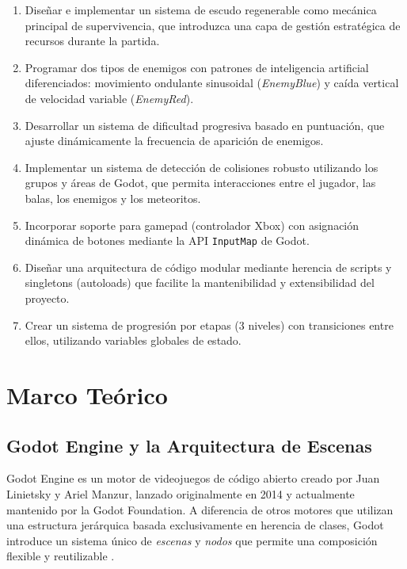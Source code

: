 \documentclass[12pt, a4paper, oneside]{report}
\begin{document}
\begin{enumerate}[label=\textbf{OE\arabic*:}, leftmargin=*]
    \item Diseñar e implementar un sistema de escudo regenerable como mecánica principal de supervivencia, que introduzca una capa de gestión estratégica de recursos durante la partida.
    \item Programar dos tipos de enemigos con patrones de inteligencia artificial diferenciados: movimiento ondulante sinusoidal (\textit{EnemyBlue}) y caída vertical de velocidad variable (\textit{EnemyRed}).
    \item Desarrollar un sistema de dificultad progresiva basado en puntuación, que ajuste dinámicamente la frecuencia de aparición de enemigos.
    \item Implementar un sistema de detección de colisiones robusto utilizando los grupos y áreas de Godot, que permita interacciones entre el jugador, las balas, los enemigos y los meteoritos.
    \item Incorporar soporte para gamepad (controlador Xbox) con asignación dinámica de botones mediante la API \texttt{InputMap} de Godot.
    \item Diseñar una arquitectura de código modular mediante herencia de scripts y singletons (autoloads) que facilite la mantenibilidad y extensibilidad del proyecto.
    \item Crear un sistema de progresión por etapas (3 niveles) con transiciones entre ellos, utilizando variables globales de estado.
\end{enumerate}

\newpage

\chapter{Marco Teórico}

\section{Godot Engine y la Arquitectura de Escenas}

Godot Engine es un motor de videojuegos de código abierto creado por Juan Linietsky y Ariel Manzur, lanzado originalmente en 2014 y actualmente mantenido por la Godot Foundation. A diferencia de otros motores que utilizan una estructura jerárquica basada exclusivamente en herencia de clases, Godot introduce un sistema único de \textit{escenas} y \textit{nodos} que permite una composición flexible y reutilizable \cite{godot_docs}.
\end{document}
